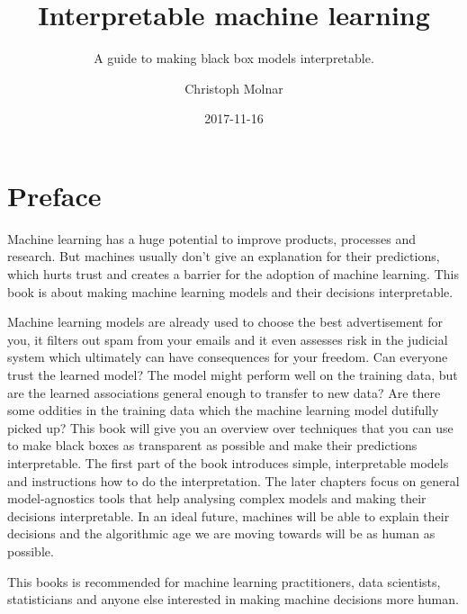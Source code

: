 \documentclass[12pt,]{krantz}
\title{Interpretable machine learning}
\subtitle{A guide to making black box models interpretable.}
\author{Christoph Molnar}
\date{2017-11-16}
\theoremstyle{definition}
\theoremstyle{definition}
\theoremstyle{definition}
\theoremstyle{remark}
\begin{document}
\maketitle



\setlength{\abovedisplayskip}{-5pt}
\setlength{\abovedisplayshortskip}{-5pt}

{
\hypersetup{linkcolor=black}
\setcounter{tocdepth}{1}
\tableofcontents
}
\chapter*{Preface}\label{preface}

Machine learning has a huge potential to improve products, processes and
research. But machines usually don't give an explanation for their
predictions, which hurts trust and creates a barrier for the adoption of
machine learning. This book is about making machine learning models and
their decisions interpretable.

Machine learning models are already used to choose the best
advertisement for you, it filters out spam from your emails and it even
assesses risk in the judicial system which ultimately can have
consequences for your freedom. Can everyone trust the learned model? The
model might perform well on the training data, but are the learned
associations general enough to transfer to new data? Are there some
oddities in the training data which the machine learning model dutifully
picked up? This book will give you an overview over techniques that you
can use to make black boxes as transparent as possible and make their
predictions interpretable. The first part of the book introduces simple,
interpretable models and instructions how to do the interpretation. The
later chapters focus on general model-agnostics tools that help
analysing complex models and making their decisions interpretable. In an
ideal future, machines will be able to explain their decisions and the
algorithmic age we are moving towards will be as human as possible.

This books is recommended for machine learning practitioners, data
scientists, statisticians and anyone else interested in making machine
decisions more human.
\end{document}
